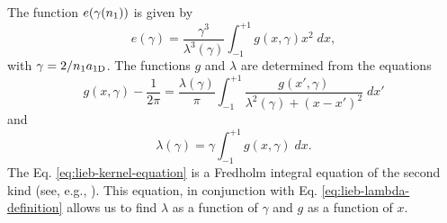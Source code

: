 The function $e(\gamma({{n}_1}))$ is given by
\cite{bib:lieb-phys-rev.130.1605.1963}
%
\begin{equation}
	\label{eq:lieb-liniger-energy-egamma}
	e(\gamma) = \frac{\gamma^3}{\lambda^3(\gamma)} \int_{-1}^{+1} g(x, \gamma) x^2 \; dx,
\end{equation}
%
with $\gamma = 2 / {{n}_1} a_{ \mathrm{1D} }$. The functions $g$ and $\lambda$ are
determined from the equations
%
\begin{equation}
	\label{eq:lieb-kernel-equation}
	g(x, \gamma) - \frac{1}{2\pi} = \frac{\lambda(\gamma)}{\pi} \int_{-1}^{+1} \frac{g(x', \gamma)}{\lambda^2(\gamma) + (x - x')^2} \; dx'
\end{equation}
%
and
%
\begin{equation}
	\label{eq:lieb-lambda-definition}
	\lambda(\gamma) = \gamma \int_{-1}^{+1} g(x, \gamma) \; dx.
\end{equation}
%
The Eq. \eqref{eq:lieb-kernel-equation} is a Fredholm integral equation of the
second kind (see, e.g., \cite[Chap. 2]{bib:zemyan-fredholm-integral.2012}). This
equation, in conjunction with Eq. \eqref{eq:lieb-lambda-definition} allows us to
find $\lambda$ as a function of $\gamma$ and $g$ as a function of $x$.

